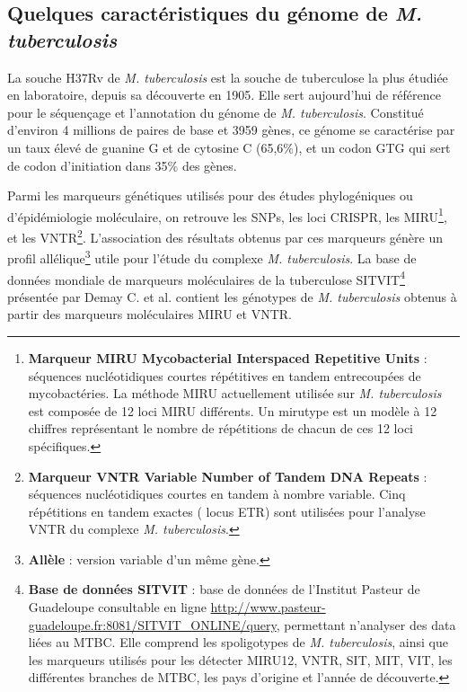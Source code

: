 \documentclass[twoside,a4paper,11pt,frenchb,openany]{report}
\begin{document}
\subsection{Quelques caractéristiques du génome de \textit{M. tuberculosis}}

La souche H37Rv de \textit{M. tuberculosis} est la souche de tuberculose la plus étudiée en laboratoire, depuis sa découverte en 1905. Elle sert aujourd'hui de référence pour le séquençage et l'annotation du génome de \textit{M. tuberculosis}. Constitué d'environ 4 millions de paires de base et 3959 gènes, ce génome se caractérise par un taux élevé de guanine G et de cytosine C (65,6\%), et un codon GTG qui sert de codon d'initiation dans 35\% des gènes. 

Parmi les marqueurs génétiques utilisés pour des études phylogéniques ou d'épidémiologie moléculaire, on retrouve les SNPs, les loci CRISPR, les MIRU\footnote{\textbf{Marqueur MIRU Mycobacterial Interspaced Repetitive Units} : séquences nucléotidiques courtes répétitives en tandem entrecoupées de mycobactéries. La méthode MIRU actuellement utilisée sur \textit{M. tuberculosis} est composée de 12 loci MIRU différents. Un mirutype est un modèle à 12 chiffres représentant le nombre de répétitions de chacun de ces 12 loci spécifiques.}, et les VNTR\footnote{\textbf{Marqueur VNTR Variable Number of Tandem DNA Repeats} : séquences nucléotidiques courtes en tandem à nombre variable. Cinq répétitions en tandem exactes ( locus ETR) sont utilisées pour l'analyse VNTR du complexe \textit{M. tuberculosis}.}. L'association des résultats obtenus par ces marqueurs génère un profil allélique\footnote{\textbf{Allèle} : version variable d'un même gène.} utile pour l'étude du complexe \textit{M. tuberculosis}. La base de données mondiale de marqueurs moléculaires de la tuberculose SITVIT\footnote{\textbf{Base de données SITVIT} : base de données de l'Institut Pasteur de Guadeloupe consultable en ligne \url{http://www.pasteur-guadeloupe.fr:8081/SITVIT_ONLINE/query}, permettant n'analyser des data liées au MTBC. Elle comprend les spoligotypes de \textit{M. tuberculosis}, ainsi que les marqueurs utilisés pour les détecter MIRU12, VNTR, SIT, MIT, VIT, les différentes branches de MTBC, les pays d'origine et l'année de découverte.} présentée par Demay C. et al.\cite{demay} contient les génotypes de \textit{M. tuberculosis} obtenus à partir des marqueurs moléculaires MIRU et VNTR.

\end{document}

